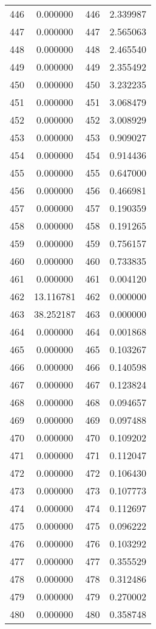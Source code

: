 \documentclass[12pt]{article}
\begin{document}
\begin{longtable}{@{}cccc@{}}
446 & 0.000000 & 446 & 2.339987 \\
447 & 0.000000 & 447 & 2.565063 \\
448 & 0.000000 & 448 & 2.465540 \\
449 & 0.000000 & 449 & 2.355492 \\
450 & 0.000000 & 450 & 3.232235 \\
451 & 0.000000 & 451 & 3.068479 \\
452 & 0.000000 & 452 & 3.008929 \\
453 & 0.000000 & 453 & 0.909027 \\
454 & 0.000000 & 454 & 0.914436 \\
455 & 0.000000 & 455 & 0.647000 \\
456 & 0.000000 & 456 & 0.466981 \\
457 & 0.000000 & 457 & 0.190359 \\
458 & 0.000000 & 458 & 0.191265 \\
459 & 0.000000 & 459 & 0.756157 \\
460 & 0.000000 & 460 & 0.733835 \\
461 & 0.000000 & 461 & 0.004120 \\
462 & 13.116781 & 462 & 0.000000 \\
463 & 38.252187 & 463 & 0.000000 \\
464 & 0.000000 & 464 & 0.001868 \\
465 & 0.000000 & 465 & 0.103267 \\
466 & 0.000000 & 466 & 0.140598 \\
467 & 0.000000 & 467 & 0.123824 \\
468 & 0.000000 & 468 & 0.094657 \\
469 & 0.000000 & 469 & 0.097488 \\
470 & 0.000000 & 470 & 0.109202 \\
471 & 0.000000 & 471 & 0.112047 \\
472 & 0.000000 & 472 & 0.106430 \\
473 & 0.000000 & 473 & 0.107773 \\
474 & 0.000000 & 474 & 0.112697 \\
475 & 0.000000 & 475 & 0.096222 \\
476 & 0.000000 & 476 & 0.103292 \\
477 & 0.000000 & 477 & 0.355529 \\
478 & 0.000000 & 478 & 0.312486 \\
479 & 0.000000 & 479 & 0.270002 \\
480 & 0.000000 & 480 & 0.358748 \\

\end{longtable}
\end{document}
